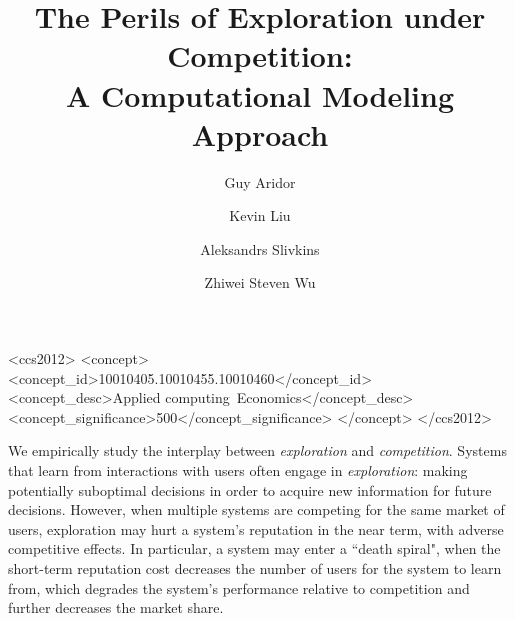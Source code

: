 \documentclass[acmsmall]{ec19acm}
\theoremstyle{definition}
\begin{document}
\title[The Perils of Exploration under Competition: A Computational Modeling Approach]
{The Perils of Exploration under Competition: \\ A Computational Modeling Approach}


 \author{Guy Aridor}
 \author{Kevin Liu}
 \author{Aleksandrs Slivkins}
 \author{Zhiwei Steven Wu}



  
  \begin{CCSXML}
<ccs2012>
<concept>
<concept_id>10010405.10010455.10010460</concept_id>
<concept_desc>Applied computing~Economics</concept_desc>
<concept_significance>500</concept_significance>
</concept>
</ccs2012>
\end{CCSXML}


\fancyhead{} 
%
%
\maketitle


We empirically study the interplay between \textit{exploration} and
  \textit{competition}. Systems that learn from interactions with
  users often engage in \emph{exploration}: making potentially
  suboptimal decisions in order to acquire new information for future
  decisions. However, when multiple systems are competing for
    the same market of users, exploration may hurt a system's
    reputation in the near term, with adverse competitive effects. In particular, a system may enter a ``death spiral", when the short-term reputation cost decreases
    the number of users for the system to learn from, which degrades the
    system's performance relative to competition and further decreases
    the market share.
\end{document}
